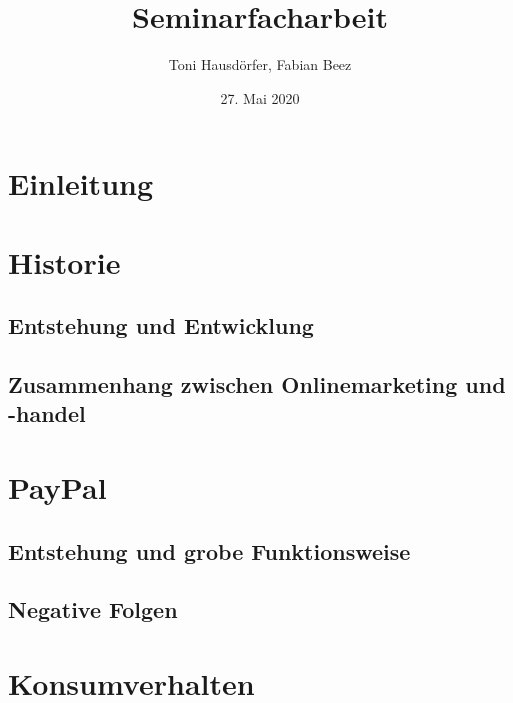 \documentclass[a4paper, 12pt]{scrartcl}
\title{Seminarfacharbeit}
\author{Toni Hausdörfer, Fabian Beez}
\date{27. Mai 2020}
\begin{document}
    
    
    
    

    \tableofcontents 
        \newpage

    \section{Einleitung}
        
        \newpage
    
    
    
    \section{Historie}
            
        \subsection{Entstehung und Entwicklung}
            
        \subsection{Zusammenhang zwischen Onlinemarketing und -handel}
            
        \newpage
        
        
        
    \section{PayPal}
		
        \subsection{Entstehung und grobe Funktionsweise}
            
        \subsection{Negative Folgen}
            
        \newpage
        
        
        
    \section{Konsumverhalten}
            
\end{document}

